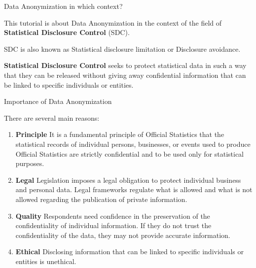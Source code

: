 \documentclass[
	aspectratio = 169
 ]{beamer}
\begin{document}
\begin{frame}{Data Anonymization in which context?}

This tutorial is about Data Anonymization in the context of the field of
\textbf{Statistical Disclosure Control} (SDC).

SDC is also known as Statistical disclosure limitation or Disclosure
avoidance.

\vspace{1cm}

\textbf{Statistical Disclosure Control} seeks to protect statistical
data in such a way that they can be released without giving away
confidential information that can be linked to specific individuals or
entities.

\end{frame}
\begin{frame}{Importance of Data Anonymization}

There are several main reasons:

\begin{enumerate}
\item
  \textbf{Principle} It is a fundamental principle of Official
  Statistics that the statistical records of individual persons,
  businesses, or events used to produce Official Statistics are strictly
  confidential and to be used only for statistical purposes.
\item
  \textbf{Legal} Legislation imposes a legal obligation to protect
  individual business and personal data. Legal frameworks regulate what
  is allowed and what is not allowed regarding the publication of
  private information.
\item
  \textbf{Quality} Respondents need confidence in the preservation of
  the confidentiality of individual information. If they do not trust
  the confidentiality of the data, they may not provide accurate
  information.
\item
  \textbf{Ethical} Disclosing information that can be linked to specific
  individuals or entities is unethical.
\end{enumerate}

\end{frame}
\end{document}

